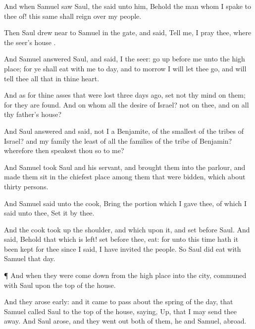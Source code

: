 {And when
Samuel
saw
Saul, the
{}
said unto him, Behold the
man whom I
spake to thee of! this same shall
reign over my
people.


\par }{\PP {}Then
Saul drew
near to
Samuel
in the
gate, and
said,
Tell me, I pray thee,
where the
seer’s
house
{}.

And
Samuel
answered
Saul, and
said, I
{} the
seer: go
up
before me unto the high
place; for ye shall
eat with me to
day, and to
morrow I will let thee
go, and will
tell thee all that
{} in thine
heart.

And as for thine
asses that were
lost
three
days
ago,
set not thy
mind on them; for they are
found. And on whom
{} all the
desire of
Israel?
{} not on thee, and on all thy
father’s
house?

And
Saul
answered and
said,
{} not I a
Benjamite, of the
smallest of the
tribes of
Israel? and my
family the
least of all the
families of the
tribe of
Benjamin? wherefore then
speakest thou
so to me?

And
Samuel
took
Saul and his
servant, and
brought them into the
parlour, and made them
sit in the
chiefest
place among them that were
bidden, which
{} about
thirty
persons.

And
Samuel
said unto the
cook,
Bring the
portion which I
gave thee, of which I
said unto thee,
Set it by thee.

And the
cook took
up the
shoulder, and
{} which
{} upon it, and
set
{}
before
Saul. And
{}
said, Behold that which is
left!
set
{}
before thee,
{}
eat: for unto this
time hath it been
kept for thee since I
said, I have
invited the
people. So
Saul did
eat with
Samuel that
day.


\par }{\PP {}¶ And when they were come
down from the high
place into the
city,
{}
communed with
Saul upon the top of the
house.

And they arose
early: and it came to pass about the
spring of the
day, that
Samuel
called
Saul to the top of the
house,
saying,
Up, that I may send thee
away. And
Saul
arose, and they went
out
both of them, he and
Samuel,
abroad.

}
